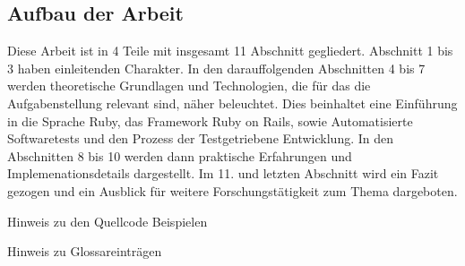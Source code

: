\subsection{Aufbau der Arbeit}

Diese Arbeit ist in 4 Teile mit insgesamt 11 Abschnitt gegliedert. Abschnitt 1 bis 3 haben einleitenden Charakter. In den darauffolgenden Abschnitten 4 bis 7 werden theoretische Grundlagen und Technologien, die für das die Aufgabenstellung relevant sind, näher beleuchtet. Dies beinhaltet eine Einführung in die Sprache Ruby, das Framework Ruby on Rails, sowie Automatisierte Softwaretests und den Prozess der Testgetriebene Entwicklung.
In den Abschnitten 8 bis 10 werden dann praktische Erfahrungen und Implemenationsdetails dargestellt. Im 11. und letzten Abschnitt wird ein Fazit gezogen und ein Ausblick für weitere Forschungstätigkeit zum Thema dargeboten.


Hinweis zu den Quellcode Beispielen

Hinweis zu Glossareinträgen
